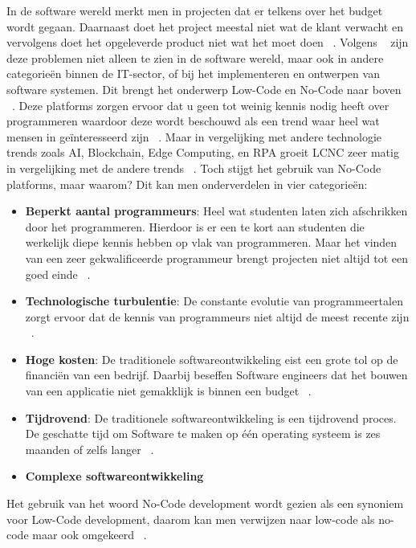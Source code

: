  In de software wereld merkt men in projecten dat er telkens over het budget wordt gegaan. Daarnaast doet het project meestal niet wat de klant verwacht 
 en vervolgens  doet het opgeleverde product niet wat het moet doen ~\autocite{Moskal_2021}. Volgens ~\textcite{Moskal_2021} zijn deze problemen niet alleen  te zien in de software wereld, 
 maar ook in andere categorieën binnen de IT-sector, of bij het implementeren en ontwerpen van software systemen. 
 Dit brengt het onderwerp Low-Code en No-Code naar boven ~\autocite{Kulkarni_2021}. 
 Deze platforms zorgen ervoor dat u geen tot weinig kennis nodig heeft over programmeren waardoor deze wordt beschouwd als een trend waar heel wat mensen in geïnteresseerd zijn ~\autocite{Kulkarni_2021}.
 Maar in vergelijking met andere technologie trends zoals AI, Blockchain, Edge Computing, en RPA groeit LCNC zeer matig in vergelijking met de andere trends ~\autocite{Kulkarni_2021}.
 Toch stijgt het gebruik van No-Code platforms, maar waarom? Dit kan men onderverdelen in vier categorieën:
\begin{itemize}
  \item \textbf{Beperkt aantal programmeurs}: 
  Heel wat studenten laten zich afschrikken door het programmeren. 
  Hierdoor is er een te kort aan studenten die werkelijk diepe kennis hebben op vlak van programmeren. 
  Maar het vinden van een zeer gekwalificeerde programmeur brengt projecten niet altijd tot een goed einde ~\autocite{Moskal_2021}.
  \item \textbf{Technologische turbulentie}: De constante evolutie van programmeertalen zorgt ervoor dat de kennis van programmeurs niet altijd de meest recente zijn  ~\autocite{Moskal_2021}.
  \item \textbf{Hoge kosten}: De traditionele softwareontwikkeling eist een grote tol op de financiën van een bedrijf. Daarbij beseffen Software engineers dat het bouwen van een applicatie niet gemakklijk is binnen een budget ~\autocite{Moskal_2021}.
  \item \textbf{Tijdrovend}: De traditionele softwareontwikkeling is een tijdrovend proces. De geschatte tijd om Software te maken op één operating systeem is zes maanden of zelfs langer ~\autocite{Moskal_2021}.
  \item \textbf{Complexe softwareontwikkeling}
\end{itemize} 
Het gebruik van het woord No-Code development wordt gezien als een synoniem voor Low-Code development,
daarom kan men verwijzen naar low-code als no-code maar ook omgekeerd ~\autocite{Rokis_2022}. 

